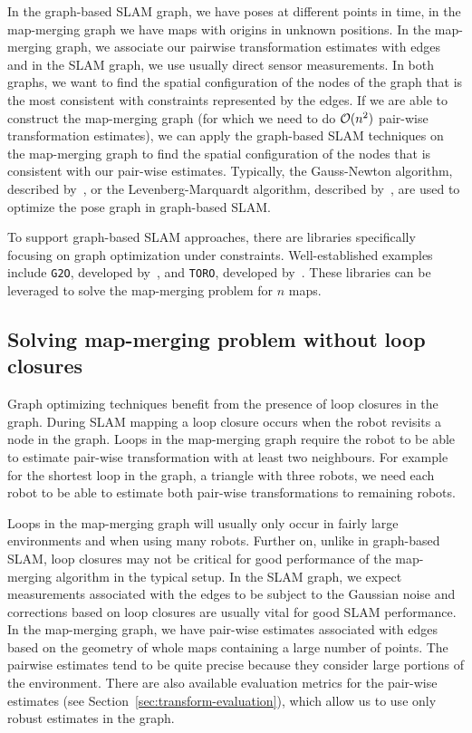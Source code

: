 In the graph-based \gls{SLAM} graph, we have poses at different points in time, in the map-merging graph we have maps with origins in unknown positions. In the map-merging graph, we associate our pairwise transformation estimates with edges and in the \gls{SLAM} graph, we use usually direct sensor measurements. In both graphs, we want to find the spatial configuration of the nodes of the graph that is the most consistent with constraints represented by the edges. If we are able to construct the map-merging graph (for which we need to do $\operatorname{\mathcal{O}}(n^2)$ pair-wise transformation estimates), we can apply the graph-based \gls{SLAM} techniques on the map-merging graph to find the spatial configuration of the nodes that is consistent with our pair-wise estimates. Typically, the Gauss-Newton algorithm, described by~\citet[ch.~3]{fletcher2013practical}, or the Levenberg-Marquardt algorithm, described by~\citet{more1978levmarq}, are used to optimize the pose graph in graph-based \gls{SLAM}.

To support graph-based \gls{SLAM} approaches, there are libraries specifically focusing on graph optimization under constraints. Well-established examples include \texttt{G2O}, developed by~\citet{kummerle2011g2o}, and \texttt{TORO}, developed by~\citet{grisetti2007toro}. These libraries can be leveraged to solve the map-merging problem for $n$ maps.

\subsection{Solving map-merging problem without loop closures}

Graph optimizing techniques benefit from the presence of loop closures in the graph. During \gls{SLAM} mapping a loop closure occurs when the robot revisits a node in the graph. Loops in the map-merging graph require the robot to be able to estimate pair-wise transformation with at least two neighbours. For example for the shortest loop in the graph, a triangle with three robots, we need each robot to be able to estimate both pair-wise transformations to remaining robots.

Loops in the map-merging graph will usually only occur in fairly large environments and when using many robots. Further on, unlike in graph-based \gls{SLAM}, loop closures may not be critical for good performance of the map-merging algorithm in the typical setup. In the \gls{SLAM} graph, we expect measurements associated with the edges to be subject to the Gaussian noise and corrections based on loop closures are usually vital for good \gls{SLAM} performance. In the map-merging graph, we have pair-wise estimates associated with edges based on the geometry of whole maps containing a large number of points. The pairwise estimates tend to be quite precise because they consider large portions of the environment. There are also available evaluation metrics for the pair-wise estimates (see Section~\ref{sec:transform-evaluation}), which allow us to use only robust estimates in the graph.

